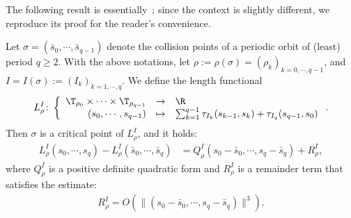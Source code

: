 \documentclass[reqno,11pt]{amsart}
\begin{document}
The following result is essentially~\cite[Lemma A.2]{de2023marked}; since the context is slightly different, we reproduce its proof for the reader's convenience.
\begin{lemma}\label{lem:quadratic-form}
    Let \( \sigma=(\bar s_{0},\cdots,\bar s_{q-1}) \) denote the collision points of a periodic orbit of (least) period \( q \geq 2 \).
    With the above notations, let \( \rho:=\rho(\sigma)=(\rho_k)_{k=0,\cdots,q-1} \), and  \( I=I(\sigma):=(I_k)_{k=1,\cdots,q} \).
    We define the length functional
    \begin{equation*}
        L_\rho^I\colon
        \left\{
        \begin{array}{rcl}
            \T_{\rho_0}\times \cdots \times \T_{\rho_{q-1}} &\to& \R\\
            (s_{0},\cdots,s_{q-1}) &\mapsto& \sum_{k = 1}^{q-1}\tau_{I_k}(s_{k-1},s_{k})+\tau_{I_q}(s_{q-1},s_0)
        \end{array}
        \right..
    \end{equation*} 
    Then \( \sigma \) is a critical point of \( L_\rho^I \), and it holds:
    \begin{align*}
        L_{\rho}^I(s_{0},\cdots,s_{q}) - 
        L_{\rho}^I(\bar s_{0},\cdots,\bar s_{q}) &= 
        Q_{\rho}^I(s_{0}-\bar s_{0},\cdots, s_{q}-\bar s_{q}) + R_{\rho}^I,
    \end{align*}
    where \( Q_{\rho}^I \) is a positive definite quadratic form and \( R_{\rho}^I \) is a remainder term that satisfies the estimate:
    \begin{align*}
        R_{\rho}^I = O(\|(s_{0}-\bar s_{0},\cdots, s_{q}-\bar s_{q})\|^{3}).
    \end{align*}
\end{lemma}
\end{document}
